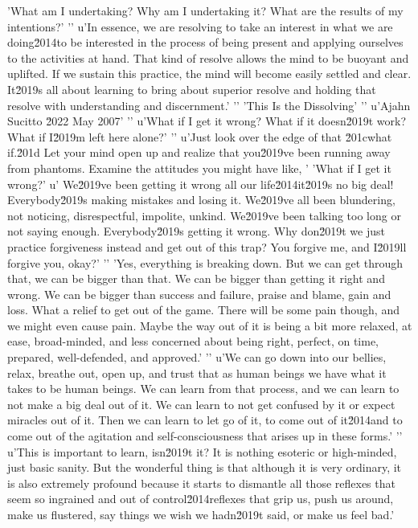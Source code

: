 'What am I undertaking? Why am I undertaking it? What are the results of my intentions?'
'\n'
u'In essence, we are resolving to take an interest in what we are doing\u2014to be interested in the process of being present and applying ourselves to the activities at hand. That kind of resolve allows the mind to be buoyant and uplifted. If we sustain this practice, the mind will become easily settled and clear. It\u2019s all about learning to bring about superior resolve and holding that resolve with understanding and discernment.'
'\n'
'This Is the Dissolving'
'\n'
u'Ajahn Sucitto \u2022 May 2007'
'\n'
u'What if I get it wrong? What if it doesn\u2019t work? What if I\u2019m left here alone?'
'\n'
u'Just look over the edge of that \u201cwhat if.\u201d Let your mind open up and realize that you\u2019ve been running away from phantoms. Examine the attitudes you might have like, '
'What if I get it wrong?'
u' We\u2019ve been getting it wrong all our life\u2014it\u2019s no big deal! Everybody\u2019s making mistakes and losing it. We\u2019ve all been blundering, not noticing, disrespectful, impolite, unkind. We\u2019ve been talking too long or not saying enough. Everybody\u2019s getting it wrong. Why don\u2019t we just practice forgiveness instead and get out of this trap? You forgive me, and I\u2019ll forgive you, okay?'
'\n'
'Yes, everything is breaking down. But we can get through that, we can be bigger than that. We can be bigger than getting it right and wrong. We can be bigger than success and failure, praise and blame, gain and loss. What a relief to get out of the game. There will be some pain though, and we might even cause pain. Maybe the way out of it is being a bit more relaxed, at ease, broad-minded, and less concerned about being right, perfect, on time, prepared, well-defended, and approved.'
'\n'
u'We can go down into our bellies, relax, breathe out, open up, and trust that as human beings we have what it takes to be human beings. We can learn from that process, and we can learn to not make a big deal out of it. We can learn to not get confused by it or expect miracles out of it. Then we can learn to let go of it, to come out of it\u2014and to come out of the agitation and self-consciousness that arises up in these forms.'
'\n'
u'This is important to learn, isn\u2019t it? It is nothing esoteric or high-minded, just basic sanity. But the wonderful thing is that although it is very ordinary, it is also extremely profound because it starts to dismantle all those reflexes that seem so ingrained and out of control\u2014reflexes that grip us, push us around, make us flustered, say things we wish we hadn\u2019t said, or make us feel bad.'

